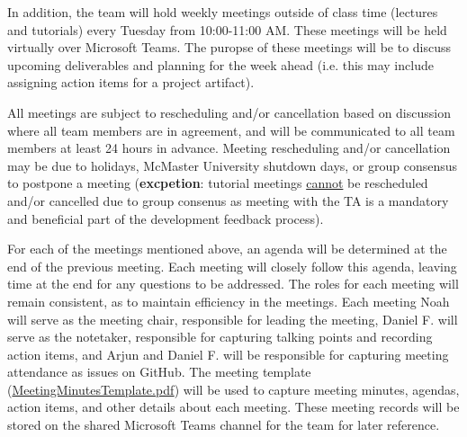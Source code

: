 \documentclass{article}
\begin{document}
In addition, the team will hold weekly meetings outside of class time (lectures and 
tutorials) every Tuesday from 10:00-11:00 AM. These meetings will be held virtually 
over Microsoft Teams. The puropse of these meetings will be to discuss upcoming 
deliverables and planning for the week ahead (i.e. this may include assigning action 
items for a project artifact).

All meetings are subject to rescheduling and/or cancellation based on discussion 
where all team members are in agreement, and will be communicated to all team 
members at least 24 hours in advance. Meeting rescheduling and/or cancellation 
may be due to holidays, McMaster University shutdown days, or group consensus to 
postpone a meeting (\textbf{excpetion}: tutorial meetings \underline{cannot} be rescheduled 
and/or cancelled due to group consenus as meeting with the TA is a mandatory and 
beneficial part of the development feedback process).

For each of the meetings mentioned above, an agenda will be determined at the 
end of the previous meeting. Each meeting will closely follow this agenda, leaving 
time at the end for any questions to be addressed. The roles for each meeting 
will remain consistent, as to maintain efficiency in the meetings. Each meeting 
Noah will serve as the meeting chair, responsible for leading the meeting, Daniel F. 
will serve as the notetaker, responsible for capturing talking points and recording 
action items, and Arjun and Daniel F. will be responsible for capturing meeting attendance as 
issues on GitHub. The meeting template (\href{pdfs/MeetingMinutesTemplate.pdf}{MeetingMinutesTemplate.pdf}) will be used to capture meeting minutes, 
agendas, action items, and other details about each meeting. These meeting records 
will be stored on the shared Microsoft Teams channel for the team for later reference.





\end{document}
